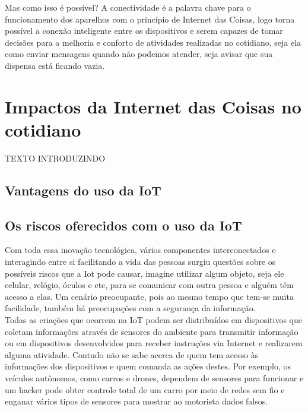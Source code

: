\documentclass[11pt]{classe_cn}                 %
\begin{document}
Mas como isso é possível? A conectividade é a palavra chave para o 
funcionamento dos aparelhos com o princípio de Internet das Coisas, 
logo torna possível a conexão inteligente entre os dispositivos e 
serem capazes de tomar decisões para a melhoria e conforto de 
atividades realizadas no cotidiano, seja ela como enviar mensagens 
quando não podemos atender, seja avisar que sua dispensa está ficando vazia.

\section{Impactos da Internet das Coisas no cotidiano}
TEXTO INTRODUZINDO

\subsection{Vantagens do uso da IoT}

\subsection{Os riscos oferecidos com o uso da IoT}
Com toda essa inovação tecnológica, vários componentes interconectados 
e interagindo entre si facilitando a vida das pessoas surgiu questões 
sobre os possíveis riscos que a Iot pode causar, imagine utilizar algum 
objeto, seja ele celular, relógio, óculos e etc, para se comunicar com 
outra pessoa e alguém têm acesso a elas. Um  cenário preocupante, pois 
ao mesmo tempo que tem-se muita facilidade, também há preocupações com 
a segurança da informação.\\

Todas as criações que ocorrem na IoT podem ser distribuídos em 
dispositivos que coletam informações através de sensores do ambiente 
para transmitir informação ou em dispositivos desenvolvidos para receber
instruções via Internet e realizarem alguma atividade. Contudo não 
se sabe acerca de quem tem acesso às informações dos dispositivos e 
quem comanda as ações destes. Por exemplo, os veículos autônomos, como 
carros e drones, dependem de sensores para funcionar e um hacker pode 
obter controle total de um carro por meio de redes sem fio e enganar 
vários tipos de sensores para mostrar ao motorista dados falsos.\\
\end{document}

